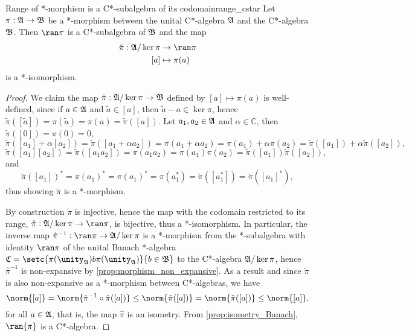 \begin{proposition}{Range of *-morphism is a C*-subalgebra of its codomain}{range_cstar}
    Let \(\pi : \mathfrak{A} \to \mathfrak{B}\) be a *-morphism between the unital C*-algebra \(\mathfrak{A}\) and the C*-algebra \(\mathfrak{B}\). Then \(\ran\pi\) is a C*-subalgebra of \(\mathfrak{B}\) and the map
    \begin{align*}
        \hat{\pi} : \algebra{A}/\ker\pi &\to \ran\pi\\
                                    [a] &\mapsto \pi(a)
    \end{align*}
    is a *-isomorphism.
\end{proposition}
\begin{proof}
    We claim the map \(\tilde{\pi} : \mathfrak{A}/\ker\pi \to \mathfrak{B}\) defined by \([a] \mapsto \pi(a)\) is well-defined, since if \(a \in \mathfrak{A}\) and \(\tilde{a} \in [a]\), then \(\tilde{a} - a \in \ker\pi\), hence \(\tilde{\pi}([\tilde{a}]) = \pi(\tilde{a}) = \pi(a) = \tilde{\pi}([a])\). Let \(a_1, a_2 \in \mathfrak{A}\) and \(\alpha \in \mathbb{C}\), then \(\tilde{\pi}([0]) = \pi(0) = 0\),
    \begin{equation*}
        \tilde{\pi}([a_1] + \alpha[a_2]) = \tilde{\pi}([a_1 + \alpha a_2]) = \pi(a_1 + \alpha a_2) = \pi(a_1) + \alpha \pi(a_2) = \tilde{\pi}([a_1]) + \alpha \tilde{\pi}([a_2]),
    \end{equation*}
    \begin{equation*}
        \tilde{\pi}([a_1][a_2]) = \tilde{\pi}([a_1a_2]) = \pi(a_1a_2) = \pi(a_1)\pi(a_2) = \tilde{\pi}([a_1])\tilde{\pi}([a_2]),
    \end{equation*}
    and
    \begin{equation*}
        \tilde{\pi}([a_1])^* = \pi(a_1)^* = \pi(a_1)^* = \pi(a_1^*) = \tilde{\pi}([a_1^*]) = \tilde{\pi}([a_1]^*),
    \end{equation*}
    thus showing \(\tilde{\pi}\) is a *-morphism.

    By construction \(\tilde{\pi}\) is injective, hence the map with the codomain restricted to its range, \(\hat{\pi} : \algebra{A}/\ker{\pi} \to \ran\pi\), is bijective, thus a *-isomorphism. In particular, the inverse map \(\hat{\pi}^{-1} : \ran\pi \to \algebra{A}/\ker{\pi}\) is a *-morphism from the *-subalgebra with identity \(\ran\pi\) of the unital Banach *-algebra \(\algebra{C} = \setc{\pi(\unity_{\algebra{A}})b\pi(\unity_{\algebra{A}})}{b \in \algebra{B}}\) to the C*-algebra \(\mathfrak{A}/\ker\pi\), hence \(\hat{\pi}^{-1}\) is non-expansive by \cref{prop:morphism_non_expansive}. As a result and since \(\tilde{\pi}\) is also non-expansive as a *-morphism between C*-algebras, we have
    \begin{equation*}
        \norm{[a]} = \norm{\hat{\pi}^{-1}\circ \hat{\pi}([a])} \leq \norm{\hat{\pi}([a])} = \norm{\tilde{\pi}([a])} \leq \norm{[a]},
    \end{equation*}
    for all \(a \in \mathfrak{A}\), that is, the map \(\hat{\pi}\) is an isometry. From \cref{prop:isometry_Banach}, \(\ran{\pi}\) is a C*-algebra.
\end{proof}

